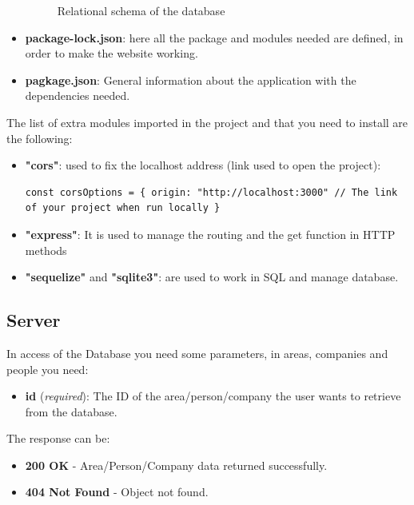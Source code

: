 \documentclass[12pt]{article}
\begin{document}
\begin{itemize}
\begin{figure}[h]
\begin{tikzpicture}[x=0.75pt,y=0.75pt,yscale=-1,xscale=1]
\end{tikzpicture}

            \caption{Relational schema of the database}
            \label{fig: RS}
        \end{figure}
        
        \item \textbf{package-lock.json}: here all the package and modules needed are defined, in order to make the website working. 
        \item \textbf{pagkage.json}: General information about the application with the dependencies needed.
    \end{itemize}
    The list of extra modules imported in the project and that you need to install are the following:
\begin{itemize}
    \item \textbf{"cors"}: used to fix the localhost address (link used to open the project):
    \begin{lstlisting}
const corsOptions = { origin: "http://localhost:3000" // The link of your project when run locally }
    \end{lstlisting}
    \item \textbf{"express"}: It is used to manage the routing and the get function in HTTP methods
    \item \textbf{"sequelize"} and \textbf{"sqlite3"}: are used to work in SQL and manage database.
\end{itemize}
\subsection{Server}
In access of the Database you need some parameters, in areas, companies and people you need:
    \begin{itemize}
        \item \textbf{id} (\textit{required}): The ID of the area/person/company the user wants to retrieve from the database.
    \end{itemize}
        The response can be:
        \begin{itemize}
            \item \textbf{200 OK} - Area/Person/Company data returned successfully.
            \item \textbf{404 Not Found} - Object not found.
        \end{itemize}
\end{document}
